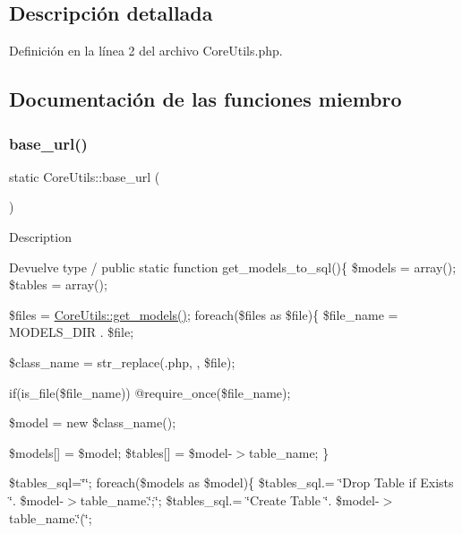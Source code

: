 \subsection{Descripción detallada}


Definición en la línea 2 del archivo Core\+Utils.\+php.



\subsection{Documentación de las funciones miembro}
\mbox{\label{class_core_utils_adcf62251d03ae5b1095544507fb63375}} 
\subsubsection{\texorpdfstring{base\_url()}{base\_url()}}
{\footnotesize\ttfamily static Core\+Utils\+::base\+\_\+url (\begin{DoxyParamCaption}{ }\end{DoxyParamCaption})\hspace{0.3cm}{\ttfamily [static]}}

Description \begin{DoxyReturn}{Devuelve}
type / public static function get\+\_\+models\+\_\+to\+\_\+sql()\{ \$models = array(); \$tables = array();
\end{DoxyReturn}
\$files = \mbox{\hyperlink{class_core_utils_a10ac6261e9a04457430db1f22d2321f9}{Core\+Utils\+::get\+\_\+models()}}; foreach(\$files as \$file)\{ \$file\+\_\+name = M\+O\+D\+E\+L\+S\+\_\+\+D\+IR . \$file;

\$class\+\_\+name = str\+\_\+replace(\textquotesingle{}.php\textquotesingle{}, \textquotesingle{}\textquotesingle{}, \$file);

if(is\+\_\+file(\$file\+\_\+name)) @require\+\_\+once(\$file\+\_\+name);

\$model = new \$class\+\_\+name();

\$models\mbox{[}\mbox{]} = \$model; \$tables\mbox{[}\mbox{]} = \$model-\/$>$table\+\_\+name; \}

\$tables\+\_\+sql=\char`\"{}\char`\"{}; foreach(\$models as \$model)\{ \$tables\+\_\+sql.= \char`\"{}\+Drop Table if Exists \char`\"{}. \$model-\/$>$table\+\_\+name.\char`\"{};\char`\"{}; \$tables\+\_\+sql.= \char`\"{}\+Create Table \char`\"{}. \$model-\/$>$table\+\_\+name.\char`\"{}(\char`\"{};

